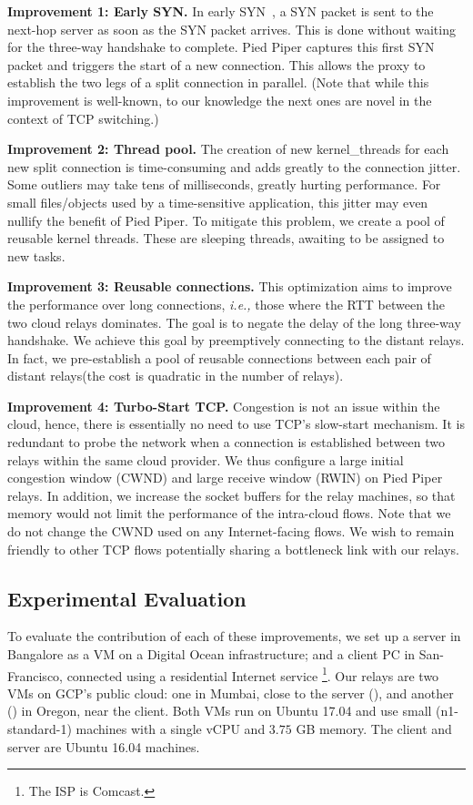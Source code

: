 \documentclass[newfonts=false,format=sigconf,anonymous,10pt,letterpaper]{acmart}
\providecommand{\ie}{\emph{i.e.,} }
\newcommand{\T}[1]{\smallskip\noindent\textbf{#1}} %
\newcommand{\oursys}{Pied Piper\xspace}
\newcommand{\proxies}{relays\xspace}
\newcommand{\reconn}{reusable connections\xspace}
\begin{document}
\T{Improvement 1: Early SYN.} In early SYN~\cite{ladiwala,siracusano2016miniproxy}, a SYN packet is sent to the next-hop server as soon as the SYN packet arrives. This is done without waiting for the three-way handshake to complete. \oursys captures this first SYN packet and triggers the start of a new connection. This allows the proxy to establish the two legs of a split connection in parallel. (Note that while this improvement is well-known, to our knowledge the next ones are novel in the context of TCP switching.)

\T{Improvement 2: Thread pool.} 
The creation of new kernel\_threads for each new split connection is time-consuming and adds greatly to the connection jitter. Some outliers may take tens of milliseconds, greatly hurting performance. For small files/objects used by a time-sensitive application, this jitter may even nullify the benefit of \oursys. To mitigate this problem, we create a pool of reusable kernel threads. These are sleeping threads, awaiting to be assigned to new tasks.

\T{Improvement 3: Reusable connections.}  This optimization aims to improve the performance over long connections, \ie those where the RTT between the two cloud relays dominates. The goal is to negate the delay of the long three-way handshake. We achieve this goal by preemptively connecting to the distant \proxies. In fact, we pre-establish a pool of \reconn between each pair of distant \proxies (the cost is quadratic in the number of \proxies).

\T{Improvement 4: Turbo-Start TCP.} 
Congestion is not an issue within the cloud, hence, there is essentially no need to use TCP's slow-start mechanism. It is redundant to probe the network when a connection is established between two \proxies within the same cloud provider. We thus configure a large initial congestion window (CWND) and large receive window (RWIN) on \oursys \proxies. In addition, we increase the socket buffers for the relay machines, so that memory would not limit the performance of the intra-cloud flows.
Note that we do not change the CWND used on any Internet-facing flows. We wish to remain friendly to other TCP flows potentially sharing a bottleneck link with our \proxies. 

\subsection{Experimental Evaluation}\label{subsec:improving-baseline}
To evaluate the contribution of each of these improvements, we set up a server in Bangalore as a VM on a Digital Ocean infrastructure; and a client PC in San-Francisco, connected using a residential Internet service \footnote{The ISP is Comcast.}. Our relays are two VMs on GCP's public cloud: one in Mumbai, close to the server (\rs), and another (\rc)  in Oregon, near the client. Both VMs run on Ubuntu 17.04 and use small (n1-standard-1) machines with a single vCPU and $3.75$ GB memory. The client and server are Ubuntu 16.04 machines.
\end{document}

